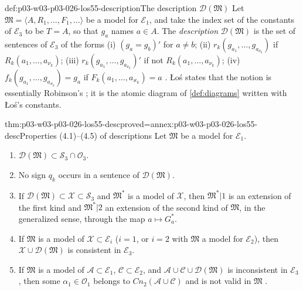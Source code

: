 \begin{hbdefinition}{def:p03-w03-p03-026-los55-description}{The description \(\mathcal D(\mathfrak M)\)}
Let \(\mathfrak M=\langle A,R_1,\ldots,F_1,\ldots\rangle\) be a model for
\(\mathcal E_1\), and take the index set of the constants of \(\mathcal E_3\)
to be \(T=A\), so that \(g_a\) names \(a\in A\).  The \emph{description}
\(\mathcal D(\mathfrak M)\) is the set of sentences of \(\mathcal E_3\) of the
forms
(i) \((g_a=g_b)'\) for \(a\neq b\);
(ii) \(r_k(g_{a_1},\ldots,g_{a_{\nu_k}})\) if \(R_k(a_1,\ldots,a_{\nu_k})\);
(iii) \(r_k(g_{a_1},\ldots,g_{a_{\nu_k}})'\) if not
\(R_k(a_1,\ldots,a_{\nu_k})\);
(iv) \(f_k(g_{a_1},\ldots,g_{a_{\varkappa_k}})=g_a\) if
\(F_k(a_1,\ldots,a_{\varkappa_k})=a\)
\cite[pp.~43--44]{Los1955}.  \L o\'s states that the notion is essentially
Robinson's \cite[p.~43]{Los1955}; it is the atomic diagram of
\cref{def:diagrams} written with \L o\'s's constants.
\end{hbdefinition}

\begin{hblemma}{thm:p03-w03-p03-026-los55-desc}{proved=annex:p03-w03-p03-026-los55-desc}{Properties (4.1)--(4.5) of descriptions}
Let \(\mathfrak M\) be a model for \(\mathcal E_1\).
\begin{enumerate}
 \item[(4.1)] \(\mathcal D(\mathfrak M)\subset\mathcal S_3\cap\mathcal O_3\).
 \item[(4.2)] No sign \(q_k\) occurs in a sentence of \(\mathcal D(\mathfrak M)\).
 \item[(4.3)] If \(\mathcal D(\mathfrak M)\subset\mathcal X\subset\mathcal S_3\)
       and \(\mathfrak M^*\) is a model of \(\mathcal X\), then
       \(\mathfrak M^*|1\) is an extension of the first kind and
       \(\mathfrak M^*|2\) an extension of the second kind of
       \(\mathfrak M\), in the generalized sense, through the map
       \(a\mapsto G^*_a\).
 \item[(4.4)] If \(\mathfrak M\) is a model of \(\mathcal X\subset\mathcal E_i\)
       (\(i=1\), or \(i=2\) with \(\mathfrak M\) a model for \(\mathcal E_2\)),
       then \(\mathcal X\cup\mathcal D(\mathfrak M)\) is consistent in
       \(\mathcal E_3\).
 \item[(4.5)] If \(\mathfrak M\) is a model of \(\mathcal A\subset\mathcal E_1\),
       \(\mathcal C\subset\mathcal E_2\), and
       \(\mathcal A\cup\mathcal C\cup\mathcal D(\mathfrak M)\) is
       inconsistent in \(\mathcal E_3\), then some \(\alpha_1\in\mathcal O_1\)
       belongs to \(\mathit{Cn}_2(\mathcal A\cup\mathcal C)\) and is not valid
       in \(\mathfrak M\)
       \cite[p.~44]{Los1955}.
\end{enumerate}
\end{hblemma}


